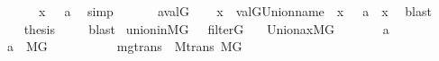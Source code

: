 \begin{isabellebody}
\isanewline
\ \ \ \ \ \ {\isachardoublequoteopen}x\ {\isasymin}\ {\isasymUnion}\ a{\isachardoublequoteclose}\ \isamarkupfalse%
\ simp\isanewline
\ \ \isacommand{{\isacharbraceright}{\kern0pt}}\isamarkupfalse%
\isanewline
\ \ \isamarkupfalse%
\ {\isacartoucheopen}a{\isacharequal}{\kern0pt}val{\isacharparenleft}{\kern0pt}G{\isacharcomma}{\kern0pt}{\isasymtau}{\isacharparenright}{\kern0pt}{\isacartoucheclose}\isanewline
\ \ \isamarkupfalse%
\ {\isachardoublequoteopen}x\ {\isasymin}\ val{\isacharparenleft}{\kern0pt}G{\isacharcomma}{\kern0pt}Union{\isacharunderscore}{\kern0pt}name{\isacharparenleft}{\kern0pt}{\isasymtau}{\isacharparenright}{\kern0pt}{\isacharparenright}{\kern0pt}\ {\isasymLongrightarrow}\ x\ {\isasymin}\ {\isasymUnion}\ a{\isachardoublequoteclose}\ \ x\ \isamarkupfalse%
\ blast\isanewline
\ \ \isamarkupfalse%
\isanewline
\ \ \isamarkupfalse%
\ {\isacharquery}{\kern0pt}thesis\ \isamarkupfalse%
\ {}\ \isamarkupfalse%
\ blast\isanewline
{}\isamarkupfalse%
%
\endisatagproof
{\isafoldproof}%
%
\isadelimproof
\isanewline
%
\endisadelimproof
\isanewline
{}\isamarkupfalse%
\ union{\isacharunderscore}{\kern0pt}in{\isacharunderscore}{\kern0pt}MG\ {\isacharcolon}{\kern0pt}\ \ {\isachardoublequoteopen}filter{\isacharparenleft}{\kern0pt}G{\isacharparenright}{\kern0pt}{\isachardoublequoteclose}\isanewline
\ \ \ {\isachardoublequoteopen}Union{\isacharunderscore}{\kern0pt}ax{\isacharparenleft}{\kern0pt}{\isacharhash}{\kern0pt}{\isacharhash}{\kern0pt}M{\isacharbrackleft}{\kern0pt}G{\isacharbrackright}{\kern0pt}{\isacharparenright}{\kern0pt}{\isachardoublequoteclose}\isanewline
%
\isadelimproof
%
\endisadelimproof
%
\isatagproof
{}\isamarkupfalse%
\ {\isacharminus}{\kern0pt}\isanewline
\ \ \isacommand{{\isacharbraceleft}{\kern0pt}}\isamarkupfalse%
\ \isamarkupfalse%
\ a\isanewline
\ \ \ \ \isamarkupfalse%
\ {\isachardoublequoteopen}a\ {\isasymin}\ M{\isacharbrackleft}{\kern0pt}G{\isacharbrackright}{\kern0pt}{\isachardoublequoteclose}\isanewline
\ \ \ \ \isamarkupfalse%
\isanewline
\ \ \ \ \isamarkupfalse%
\ mgtrans\ {\isacharcolon}{\kern0pt}\ M{\isacharunderscore}{\kern0pt}trans\ {\isachardoublequoteopen}{\isacharhash}{\kern0pt}{\isacharhash}{\kern0pt}M{\isacharbrackleft}{\kern0pt}G{\isacharbrackright}{\kern0pt}{\isachardoublequoteclose}\isanewline

\end{isabellebody}
